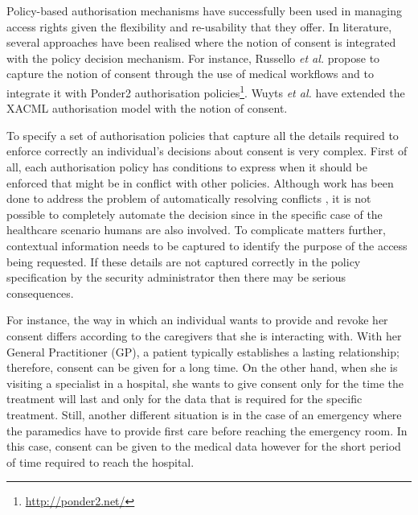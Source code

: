 \documentclass[10pt, conference, compsocconf]{IEEEtran}
\begin{document}
Policy-based authorisation mechanisms have successfully been used in managing access rights given the flexibility and re-usability that they offer. In literature, several approaches have been realised where the notion of consent is integrated with the policy decision mechanism. For instance, Russello \emph{et al.} \cite{Russello2008} propose to capture the notion of consent through the use of medical workflows and to integrate it with Ponder2 authorisation policies\footnote{\url{http://ponder2.net/}}. Wuyts \emph{et al.} \cite{Wuyts2011} have extended the XACML \cite{OASIS} authorisation model with the notion of consent.


To specify a set of authorisation policies that capture all the details required to enforce correctly an individual's decisions about consent is very complex. First of all, each authorisation policy has conditions to express when it should be enforced that might be in conflict with other policies. Although work has been done to address the problem of automatically resolving conflicts \cite{Russello2007}, it is not possible to completely automate the decision since in the specific case of the healthcare scenario humans are also involved. To complicate matters further, contextual information needs to be captured to identify the purpose of the access being requested. If these details are not captured correctly in the policy specification by the security administrator then there may be serious consequences.

For instance, the way in which an individual wants to provide and revoke her consent differs according to the caregivers that she is interacting with. With her General Practitioner (GP), a patient typically establishes a lasting relationship; therefore, consent can be given for a long time. On the other hand, when she is visiting a specialist in a hospital, she wants to give consent only for the time the treatment will last and only for the data that is required for the specific treatment. Still, another different situation is in the case of an emergency where the paramedics have to provide first care before reaching the emergency room. In this case, consent can be given to the medical data however for the short period of time required to reach the hospital.
\end{document}
